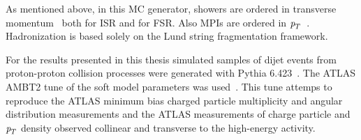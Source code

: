 As mentioned above, in this MC generator, showers are ordered in transverse momentum~\cite{Pythia_partonshowers} both for ISR and for FSR. Also MPIs are ordered in ${\emph{p}_{T}}$~\cite{Pythia_mpi}. Hadronization is based solely on the Lund string fragmentation framework.

For the results presented in this thesis simulated samples of dijet events from proton-proton collision processes were generated  with {\sc Pythia} 6.423~\cite{PYTHIA6}. The ATLAS AMBT2 tune of the soft model parameters was used~\cite{Pythia_MC11tune}. This tune attemps to reproduce the ATLAS minimum bias charged particle multiplicity and angular distribution measurements and the ATLAS measurements of charge particle and ${\emph{p}_{T}}$ density observed collinear and transverse to the high-energy activity.

